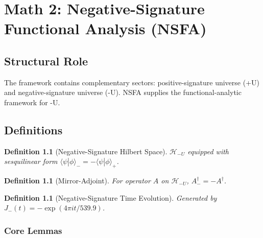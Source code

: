 \documentclass[11pt,a4paper]{book}
\newtheorem{definition}[theorem]{Definition}
\theoremstyle{remark}
\theoremstyle{definition}
\begin{document}










\chapter{Math 2: Negative-Signature Functional Analysis (NSFA)}

\section{Structural Role}

The framework contains complementary sectors: positive-signature universe (+U) and negative-signature universe (-U). NSFA supplies the functional-analytic framework for -U.

\section{Definitions}

\begin{definition}[Negative-Signature Hilbert Space]
\(\mathcal{H}_{-U}\) equipped with sesquilinear form \(\langle\psi|\phi\rangle_- = -\langle\psi|\phi\rangle_+\).
\end{definition}

\begin{definition}[Mirror-Adjoint]
For operator \(A\) on \(\mathcal{H}_{-U}\), \(A^\dagger_- = -A^\dagger\).
\end{definition}

\begin{definition}[Negative-Signature Time Evolution]
Generated by \(J_-(t) = -\exp(4\pi i t / 539.9)\).
\end{definition}

\subsection{Core Lemmas}
\end{document}
